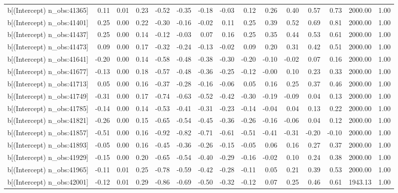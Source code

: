 \begin{table}[ht]
\begin{tabular}{rrrrrrrrrrrrrrr}
  b[(Intercept) n\_obs:41365] & 0.11 & 0.01 & 0.23 & -0.52 & -0.35 & -0.18 & -0.03 & 0.12 & 0.26 & 0.40 & 0.57 & 0.73 & 2000.00 & 1.00 \\ 
  b[(Intercept) n\_obs:41401] & 0.25 & 0.00 & 0.22 & -0.30 & -0.16 & -0.02 & 0.11 & 0.25 & 0.39 & 0.52 & 0.69 & 0.81 & 2000.00 & 1.00 \\ 
  b[(Intercept) n\_obs:41437] & 0.25 & 0.00 & 0.14 & -0.12 & -0.03 & 0.07 & 0.16 & 0.25 & 0.35 & 0.44 & 0.53 & 0.61 & 2000.00 & 1.00 \\ 
  b[(Intercept) n\_obs:41473] & 0.09 & 0.00 & 0.17 & -0.32 & -0.24 & -0.13 & -0.02 & 0.09 & 0.20 & 0.31 & 0.42 & 0.51 & 2000.00 & 1.00 \\ 
  b[(Intercept) n\_obs:41641] & -0.20 & 0.00 & 0.14 & -0.58 & -0.48 & -0.38 & -0.30 & -0.20 & -0.10 & -0.02 & 0.07 & 0.16 & 2000.00 & 1.00 \\ 
  b[(Intercept) n\_obs:41677] & -0.13 & 0.00 & 0.18 & -0.57 & -0.48 & -0.36 & -0.25 & -0.12 & -0.00 & 0.10 & 0.23 & 0.33 & 2000.00 & 1.00 \\ 
  b[(Intercept) n\_obs:41713] & 0.05 & 0.00 & 0.16 & -0.37 & -0.28 & -0.16 & -0.06 & 0.05 & 0.16 & 0.25 & 0.37 & 0.46 & 2000.00 & 1.00 \\ 
  b[(Intercept) n\_obs:41749] & -0.31 & 0.00 & 0.17 & -0.74 & -0.63 & -0.52 & -0.42 & -0.30 & -0.19 & -0.09 & 0.04 & 0.13 & 2000.00 & 1.00 \\ 
  b[(Intercept) n\_obs:41785] & -0.14 & 0.00 & 0.14 & -0.53 & -0.41 & -0.31 & -0.23 & -0.14 & -0.04 & 0.04 & 0.13 & 0.22 & 2000.00 & 1.00 \\ 
  b[(Intercept) n\_obs:41821] & -0.26 & 0.00 & 0.15 & -0.65 & -0.54 & -0.45 & -0.36 & -0.26 & -0.16 & -0.06 & 0.04 & 0.12 & 2000.00 & 1.00 \\ 
  b[(Intercept) n\_obs:41857] & -0.51 & 0.00 & 0.16 & -0.92 & -0.82 & -0.71 & -0.61 & -0.51 & -0.41 & -0.31 & -0.20 & -0.10 & 2000.00 & 1.00 \\ 
  b[(Intercept) n\_obs:41893] & -0.05 & 0.00 & 0.16 & -0.45 & -0.36 & -0.26 & -0.15 & -0.05 & 0.06 & 0.16 & 0.27 & 0.37 & 2000.00 & 1.00 \\ 
  b[(Intercept) n\_obs:41929] & -0.15 & 0.00 & 0.20 & -0.65 & -0.54 & -0.40 & -0.29 & -0.16 & -0.02 & 0.10 & 0.24 & 0.38 & 2000.00 & 1.00 \\ 
  b[(Intercept) n\_obs:41965] & -0.11 & 0.01 & 0.25 & -0.78 & -0.59 & -0.42 & -0.28 & -0.11 & 0.05 & 0.21 & 0.39 & 0.53 & 2000.00 & 1.00 \\ 
  b[(Intercept) n\_obs:42001] & -0.12 & 0.01 & 0.29 & -0.86 & -0.69 & -0.50 & -0.32 & -0.12 & 0.07 & 0.25 & 0.46 & 0.61 & 1943.13 & 1.00 \\ 

\end{tabular}
\end{table}
